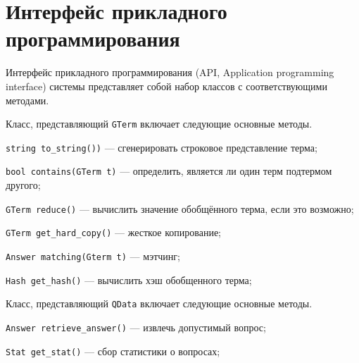 

\section{Интерфейс прикладного программирования}
Интерфейс прикладного программирования (API, Application programming interface) системы представляет собой набор классов с соответствующими методами.

Класс, представляющий \texttt{GTerm} включает следующие основные методы.
\begin{description}
  \item{\texttt{string to\_string())}} --- сгенерировать строковое представление терма;
  \item{\texttt{bool contains(GTerm t)}} --- определить, является ли один терм подтермом другого;
  \item{\texttt{GTerm reduce()}} --- вычислить значение обобщённого терма, если это возможно;
  \item{\texttt{GTerm get\_hard\_copy()}} --- жесткое копирование;
  \item{\texttt{Answer matching(Gterm t)}} --- мэтчинг;
  \item{\texttt{Hash get\_hash()}} --- вычислить хэш обобщенного терма;
\end{description}

Класс, представляющий \texttt{QData} включает следующие основные методы.
\begin{description}
  \item{\texttt{Answer retrieve\_answer()}} --- извлечь допустимый вопрос;
  \item{\texttt{Stat get\_stat()}} --- сбор статистики о вопросах;
\end{description}





